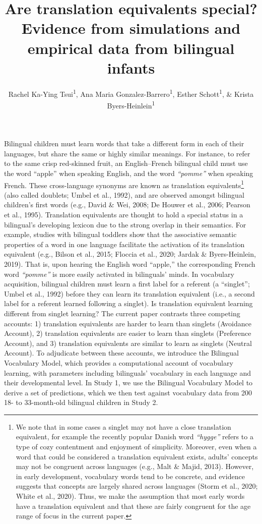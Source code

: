 \documentclass[
  english,
  ,man,floatsintext]{apa6}
\title{Are translation equivalents special? Evidence from simulations and empirical data from bilingual infants}
\author{Rachel Ka-Ying Tsui\textsuperscript{1}, Ana Maria Gonzalez-Barrero\textsuperscript{1}, Esther Schott\textsuperscript{1}, \& Krista Byers-Heinlein\textsuperscript{1}}
\date{}
\affiliation{\vspace{0.5cm}\textsuperscript{1} Concordia University}
\begin{document}
\maketitle

\captionsetup[table]{labelformat=empty}

Bilingual children must learn words that take a different form in each of their languages, but share the same or highly similar meanings. For instance, to refer to the same crisp red-skinned fruit, an English--French bilingual child must use the word ``apple'' when speaking English, and the word \emph{``pomme''} when speaking French. These cross-language synonyms are known as translation equivalents\footnote{We note that in some cases a singlet may not have a close translation equivalent, for example the recently popular Danish word \emph{``hygge''} refers to a type of cozy contentment and enjoyment of simplicity. Moreover, even when a word that could be considered a translation equivalent exists, adults' concepts may not be congruent across languages (e.g., Malt \& Majid, 2013). However, in early development, vocabulary words tend to be concrete, and evidence suggests that concepts are largely shared across languages (Storm et al., 2020; White et al., 2020). Thus, we make the assumption that most early words have a translation equivalent and that these are fairly congruent for the age range of focus in the current paper.} (also called doublets; Umbel et al., 1992), and are observed amongst bilingual children's first words (e.g., David \& Wei, 2008; De Houwer et al., 2006; Pearson et al., 1995). Translation equivalents are thought to hold a special status in a bilingual's developing lexicon due to the strong overlap in their semantics. For example, studies with bilingual toddlers show that the associative semantic properties of a word in one language facilitate the activation of its translation equivalent (e.g., Bilson et al., 2015; Floccia et al., 2020; Jardak \& Byers-Heinlein, 2019). That is, upon hearing the English word ``apple,'' the corresponding French word \emph{``pomme''} is more easily activated in bilinguals' minds. In vocabulary acquisition, bilingual children must learn a first label for a referent (a ``singlet''; Umbel et al., 1992) before they can learn its translation equivalent (i.e., a second label for a referent learned following a singlet). Is translation equivalent learning different from singlet learning? The current paper contrasts three competing accounts: 1) translation equivalents are harder to learn than singlets (Avoidance Account), 2) translation equivalents are easier to learn than singlets (Preference Account), and 3) translation equivalents are similar to learn as singlets (Neutral Account). To adjudicate between these accounts, we introduce the Bilingual Vocabulary Model, which provides a computational account of vocabulary learning, with parameters including bilinguals' vocabulary in each language and their developmental level. In Study 1, we use the Bilingual Vocabulary Model to derive a set of predictions, which we then test against vocabulary data from 200 18- to 33-month-old bilingual children in Study 2.
\end{document}
